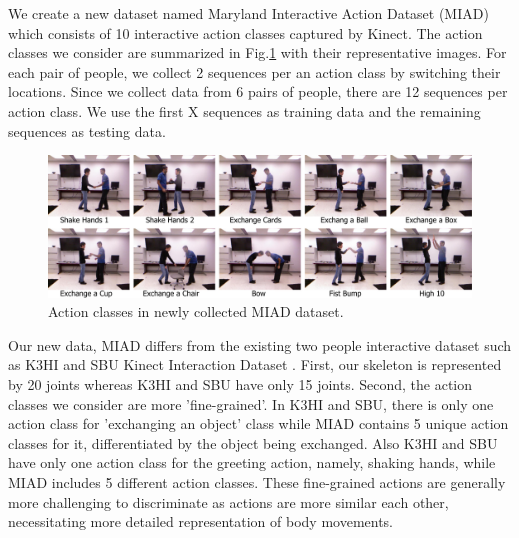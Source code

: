 \documentclass[10pt,twocolumn,letterpaper]{article}
\begin{document}
We create a new dataset named Maryland Interactive Action Dataset (MIAD) which consists of 10 interactive action classes captured by Kinect. The action classes we consider are summarized in Fig.\ref{fig:newactions} with their representative images. For each pair of people, we collect 2 sequences per an action class by switching their locations. Since we collect data from 6 pairs of people, there are 12 sequences per action class. We use the first X sequences as training data and the remaining sequences as testing data.

\begin{figure}[htb]
\begin{center}
\includegraphics[width=6.8in]{newactions.pdf}
\caption{Action classes in newly collected MIAD dataset.  \label{fig:newactions}}
\end{center}
\end{figure}

Our new data, MIAD differs from the existing two people interactive dataset such as K3HI \cite{K3HI} and SBU Kinect Interaction Dataset \cite{Yun2012}. First, our skeleton is represented by 20 joints whereas K3HI and SBU have only 15 joints. Second, the action classes we consider are more 'fine-grained'. In K3HI and SBU, there is only one action class for 'exchanging an object' class while MIAD contains 5 unique action classes for it, differentiated by the object being exchanged. Also K3HI and SBU have only one action class for the greeting action, namely, shaking hands, while MIAD includes 5 different action classes. These fine-grained actions are generally more challenging to discriminate as actions are more similar each other, necessitating more detailed representation of body movements.



\end{document}
